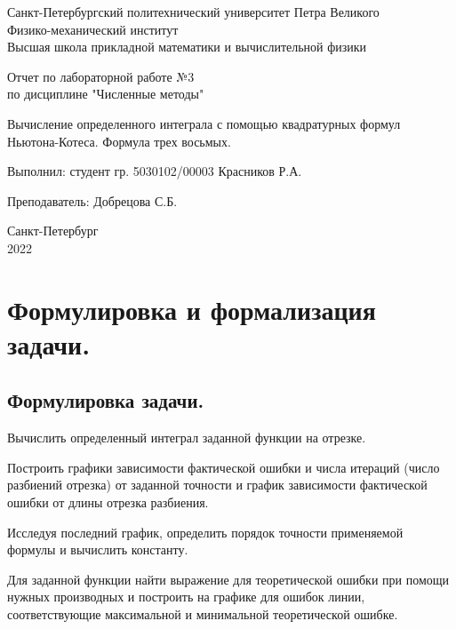 \documentclass[a4paper, 12pt]{article}
\begin{document}
	\begin{titlepage}
		\begin{center}
			Санкт-Петербургский политехнический университет Петра Великого \\ Физико-механический институт \\ Высшая школа прикладной математики и вычислительной физики
		\end{center}
		\vspace{10em}
		\begin{center}
			\Large Отчет по лабораторной работе №3 \\ по дисциплине "Численные методы"
		\end{center}
		\vspace{1em}
		\begin{center}
			\Huge Вычисление определенного интеграла с помощью квадратурных формул Ньютона-Котеса. Формула трех восьмых.
		\end{center}
		\vspace{15em}
		{\Large 
			
			Выполнил: студент гр. 5030102/00003 Красников Р.А.
			\vspace{1em}
			
			Преподаватель: Добрецова С.Б.}
		\vspace{\fill}
		\begin{center}
			Санкт-Петербург \\ 2022
		\end{center}
	\end{titlepage}
	\newpage
	
	\section{Формулировка и формализация задачи.}
	
	\subsection{Формулировка задачи.}
	
	Вычислить определенный интеграл заданной функции на отрезке.
	
	Построить графики зависимости фактической ошибки и числа итераций (число разбиений отрезка) от заданной точности и график зависимости фактической ошибки от длины отрезка разбиения.
	
	Исследуя последний график, определить порядок точности применяемой формулы и вычислить константу.
	
	Для заданной функции найти выражение для теоретической ошибки при помощи нужных производных и построить на графике для ошибок линии, соответствующие максимальной и минимальной теоретической ошибке.
	
\end{document}
